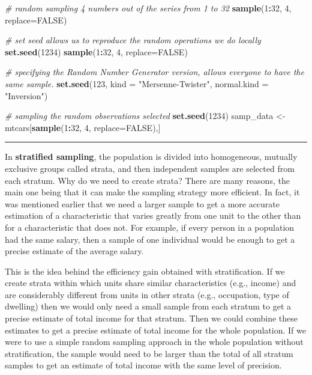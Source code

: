 \documentclass[
]{svmono}
\newenvironment{Shaded}{\begin{snugshade}}{\end{snugshade}}
\newcommand{\AttributeTok}[1]{\textcolor[rgb]{0.13,0.29,0.53}{#1}}
\newcommand{\CommentTok}[1]{\textcolor[rgb]{0.56,0.35,0.01}{\textit{#1}}}
\newcommand{\ConstantTok}[1]{\textcolor[rgb]{0.56,0.35,0.01}{#1}}
\newcommand{\DecValTok}[1]{\textcolor[rgb]{0.00,0.00,0.81}{#1}}
\newcommand{\FunctionTok}[1]{\textcolor[rgb]{0.13,0.29,0.53}{\textbf{#1}}}
\newcommand{\NormalTok}[1]{#1}
\newcommand{\OtherTok}[1]{\textcolor[rgb]{0.56,0.35,0.01}{#1}}
\newcommand{\SpecialCharTok}[1]{\textcolor[rgb]{0.81,0.36,0.00}{\textbf{#1}}}
\newcommand{\StringTok}[1]{\textcolor[rgb]{0.31,0.60,0.02}{#1}}
\begin{document}
\begin{Shaded}
\begin{Highlighting}[]
\CommentTok{\# random sampling 4 numbers out of the series from 1 to 32}
\FunctionTok{sample}\NormalTok{(}\DecValTok{1}\SpecialCharTok{:}\DecValTok{32}\NormalTok{, }\DecValTok{4}\NormalTok{, }\AttributeTok{replace=}\ConstantTok{FALSE}\NormalTok{)}

\CommentTok{\# set seed allows us to reproduce the random operations we do locally}
\FunctionTok{set.seed}\NormalTok{(}\DecValTok{1234}\NormalTok{)}
\FunctionTok{sample}\NormalTok{(}\DecValTok{1}\SpecialCharTok{:}\DecValTok{32}\NormalTok{, }\DecValTok{4}\NormalTok{, }\AttributeTok{replace=}\ConstantTok{FALSE}\NormalTok{)}

\CommentTok{\# specifying the Random Number Generator version, allows everyone to have the same sample. }
\FunctionTok{set.seed}\NormalTok{(}\DecValTok{123}\NormalTok{, }\AttributeTok{kind =} \StringTok{"Mersenne{-}Twister"}\NormalTok{, }\AttributeTok{normal.kind =}  \StringTok{"Inversion"}\NormalTok{)}

\CommentTok{\# sampling the random observations selected}
\FunctionTok{set.seed}\NormalTok{(}\DecValTok{1234}\NormalTok{)}
\NormalTok{samp\_data }\OtherTok{\textless{}{-}}\NormalTok{ mtcars[}\FunctionTok{sample}\NormalTok{(}\DecValTok{1}\SpecialCharTok{:}\DecValTok{32}\NormalTok{, }\DecValTok{4}\NormalTok{, }\AttributeTok{replace=}\ConstantTok{FALSE}\NormalTok{),]}
\end{Highlighting}
\end{Shaded}

\begin{center}\rule{0.5\linewidth}{0.5pt}\end{center}

In \textbf{stratified sampling}, the population is divided into homogeneous,
mutually exclusive groups called strata, and then independent samples
are selected from each stratum. Why do we need to create strata? There
are many reasons, the main one being that it can make the sampling
strategy more efficient. In fact, it was mentioned earlier that we need
a larger sample to get a more accurate estimation of a characteristic
that varies greatly from one unit to the other than for a characteristic
that does not. For example, if every person in a population had the same
salary, then a sample of one individual would be enough to get a precise
estimate of the average salary.

This is the idea behind the efficiency gain obtained with
stratification. If we create strata within which units share similar
characteristics (e.g., income) and are considerably different from units
in other strata (e.g., occupation, type of dwelling) then we would only
need a small sample from each stratum to get a precise estimate of total
income for that stratum. Then we could combine these estimates to get a
precise estimate of total income for the whole population. If we were to
use a simple random sampling approach in the whole population without
stratification, the sample would need to be larger than the total of all
stratum samples to get an estimate of total income with the same level
of precision.
\end{document}
